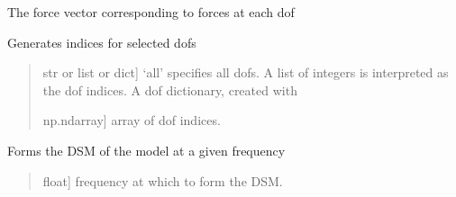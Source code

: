 \documentclass[letterpaper,10pt,english]{sphinxmanual}
\begin{document}
\begin{fulllineitems}
\begin{fulllineitems}
\end{fulllineitems}


\begin{fulllineitems}
\label{\detokenize{model:pywfe.Model.force}}
\pysigstartsignatures
{}
\pysigstopsignatures
\sphinxAtStartPar
The force vector corresponding to forces at each dof

\end{fulllineitems}


\begin{fulllineitems}
\label{\detokenize{model:pywfe.Model.dofs_to_indices}}
\pysigstartsignatures
{}
\pysigstopsignatures
\sphinxAtStartPar
Generates indices for selected dofs
\begin{quote}\begin{description}
\begin{description}
\sphinxlineitem{\sphinxstylestrong{dofs}}{[}str or list or dict{]}
\sphinxAtStartPar
‘all’ specifies all dofs.
A list of integers is interpreted as the dof indices.
A dof dictionary, created with 

\end{description}

\begin{description}
\sphinxlineitem{\sphinxstylestrong{inds}}{[}np.ndarray{]}
\sphinxAtStartPar
array of dof indices.

\end{description}

\end{description}\end{quote}

\end{fulllineitems}


\begin{fulllineitems}
\label{\detokenize{model:pywfe.Model.form_dsm}}
\pysigstartsignatures
{}
\pysigstopsignatures
\sphinxAtStartPar
Forms the DSM of the model at a given frequency
\begin{quote}\begin{description}
\begin{description}
\sphinxlineitem{\sphinxstylestrong{f}}{[}float{]}
\sphinxAtStartPar
frequency at which to form the DSM.


\end{description}
\end{description}
\end{quote}
\end{fulllineitems}
\end{fulllineitems}
\end{document}

